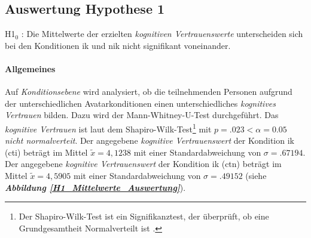 \documentclass[a4paper,11pt]{article}%
\renewcommand{\\}{\vspace*{0.5\baselineskip} \newline}
\begin{document}
%
%

\clearpage
\newpage	
	\subsection{Auswertung Hypothese 1}
H1$_{0}$ : Die Mittelwerte der erzielten \textit{kognitiven Vertrauenswerte} unterscheiden sich bei den Konditionen \ac{ik} und \ac{nik} nicht signifikant voneinander.

\paragraph{Allgemeines}
Auf \textit{Konditionsebene} wird analysiert, ob die teilnehmenden Personen aufgrund der unterschiedlichen Avatarkonditionen einen unterschiedliches \textit{kognitives Vertrauen} bilden. Dazu wird der Mann-Whitney-U-Test durchgeführt.\\
Das \textit{kognitive Vertrauen} ist laut dem Shapiro-Wilk-Test\footnote{Der Shapiro-Wilk-Test ist ein Signifikanztest, der überprüft, ob eine Grundgesamtheit Normalverteilt ist \citep[p.25]{razali2011power}.} mit $p = .023 < \alpha = 0.05$ \textit{nicht normalverteit}.
Der angegebene \textit{kognitive Vertrauenswert} der Kondition \ac{ik} (\ac{cti}) beträgt im Mittel $\tilde x = 4,1238$ mit einer Standardabweichung von $\sigma = .67194$.\newline 
Der angegebene \textit{kognitive Vertrauenswert} der Kondition \ac{ik} (\ac{ctn}) beträgt im Mittel $\tilde x = 4,5905$ mit einer Standardabweichung von $\sigma = .49152$ (siehe \textbf{\textit{Abbildung \ref{H1_Mittelwerte_Auswertung}}}).
\end{document}
